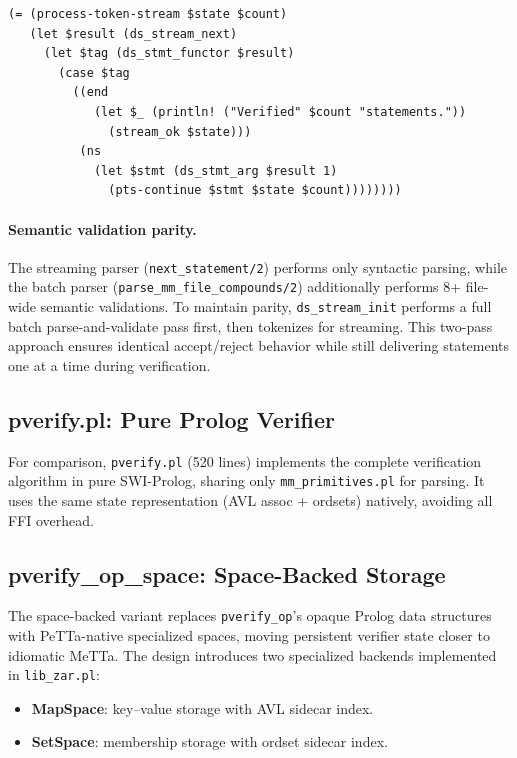 \documentclass[11pt]{article}
\begin{document}
\begin{lstlisting}[language=MeTTa,caption={Streaming loop with tagged return.}]
(= (process-token-stream $state $count)
   (let $result (ds_stream_next)
     (let $tag (ds_stmt_functor $result)
       (case $tag
         ((end
            (let $_ (println! ("Verified" $count "statements."))
              (stream_ok $state)))
          (ns
            (let $stmt (ds_stmt_arg $result 1)
              (pts-continue $stmt $state $count))))))))
\end{lstlisting}

\paragraph{Semantic validation parity.}
The streaming parser (\texttt{next\_statement/2}) performs only
syntactic parsing, while the batch parser
(\texttt{parse\_mm\_file\_compounds/2}) additionally performs 8+
file-wide semantic validations.  To maintain parity,
\texttt{ds\_stream\_init} performs a full batch parse-and-validate
pass first, then tokenizes for streaming.  This two-pass approach
ensures identical accept/reject behavior while still delivering
statements one at a time during verification.

\subsection{pverify.pl: Pure Prolog Verifier}

For comparison, \texttt{pverify.pl} (520 lines) implements the
complete verification algorithm in pure SWI-Prolog, sharing only
\texttt{mm\_primitives.pl} for parsing.  It uses the same state
representation (AVL assoc + ordsets) natively, avoiding all FFI
overhead.

\subsection{pverify\_op\_space: Space-Backed Storage}
\label{sec:opspace}

The space-backed variant replaces \texttt{pverify\_op}'s opaque
Prolog data structures with PeTTa-native specialized spaces,
moving persistent verifier state closer to idiomatic MeTTa.
The design introduces two specialized backends implemented in
\texttt{lib\_zar.pl}:

\begin{itemize}[leftmargin=2em]
  \item \textbf{MapSpace}: key--value storage with AVL sidecar index.
  \item \textbf{SetSpace}: membership storage with ordset sidecar index.
\end{itemize}
\end{document}
